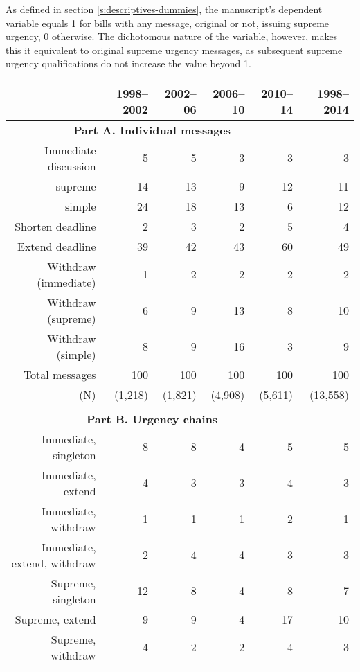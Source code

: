 \documentclass[letter,12pt]{article}
\begin{document}
As defined in section \ref{s:descriptives-dummies}, the manuscript's dependent variable equals 1 for bills with any message, original or not, issuing supreme urgency, 0 otherwise. The dichotomous nature of the variable, however, makes this it equivalent to original supreme urgency messages, as subsequent supreme urgency qualifications do not increase the value beyond 1. 

\begin{table}
\centering
\begin{tabular}{rrrrr|r}
      & 1998--2002 & 2002--06 & 2006--10 & 2010--14 & 1998--2014 \\ \hline
 \multicolumn{5}{c|}{\textbf{Part A. Individual messages}} \\
 Immediate discussion& 5  & 5  & 3  & 3  & 3 \\ 
 supreme             & 14 & 13 & 9  & 12 & 11 \\ 
 simple              & 24 & 18 & 13 & 6  & 12 \\ \hdashline
 Shorten deadline    & 2  & 3  & 2  & 5  &  4 \\ 
 Extend deadline     & 39 & 42 & 43 & 60 & 49 \\ \hdashline
 Withdraw (immediate)& 1  & 2  & 2  & 2  &  2 \\ 
 Withdraw (supreme)  & 6  & 9  & 13 & 8  & 10 \\ 
 Withdraw (simple)   & 8  & 9  & 16 & 3  & 9  \\ \hline
 Total messages      & 100 & 100 & 100 & 100 & 100 \\ 
(N)                  & (1,218) & (1,821) & (4,908) & (5,611) & (13,558)\\ 
\\ [-1.5ex]
 \multicolumn{5}{c|}{\textbf{Part B. Urgency chains}}  \\
Immediate, singleton        & 8  & 8  & 4  & 5  &   5  \\
Immediate, extend           & 4  & 3  & 3  & 4  &   3  \\
Immediate, withdraw         & 1  & 1  & 1  & 2  &   1  \\
Immediate, extend, withdraw & 2  & 4  & 4  & 3  &   3  \\ \hdashline
Supreme, singleton          & 12 & 8  & 4  & 8  &   7  \\
Supreme, extend             & 9  & 9  & 4  & 17 &  10  \\
Supreme, withdraw           & 4  & 2  & 2  & 4  &   3  \\

\end{tabular}
\end{table}
\end{document}

